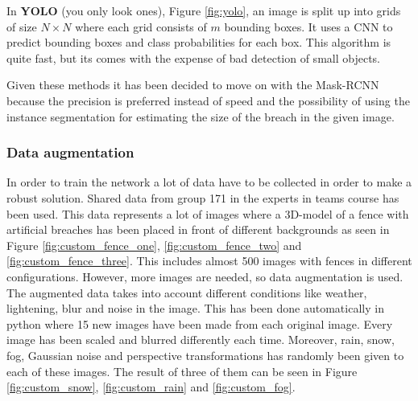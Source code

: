 \documentclass[../Head/Main.tex]{subfiles}
\begin{document}
In \textbf{YOLO} (you only look ones), Figure \ref{fig:yolo}, an image is split up into grids of size $N \times N$ where each grid consists of $m$ bounding boxes. It uses a CNN to predict bounding boxes and class probabilities for each box. This algorithm is quite fast, but its comes with the expense of bad detection of small objects.

Given these methods it has been decided to move on with the Mask-RCNN because the precision is preferred instead of speed and the possibility of using the instance segmentation for estimating the size of the breach in the given image.

\subsubsection*{Data augmentation}
In order to train the network a lot of data have to be collected in order to make a robust solution. Shared data from group 171 in the experts in teams course has been used. This data represents a lot of images where a 3D-model of a fence with artificial breaches has been placed in front of different backgrounds as seen in Figure \ref{fig:custom_fence_one}, \ref{fig:custom_fence_two} and \ref{fig:custom_fence_three}. This includes almost 500 images with fences in different configurations. However, more images are needed, so data augmentation is used. The augmented data takes into account different conditions like weather, lightening, blur and noise in the image. This has been done automatically in python where 15 new images have been made from each original image. Every image has been scaled and blurred differently each time. Moreover, rain, snow, fog, Gaussian noise and perspective transformations has randomly been given to each of these images. The result of three of them can be seen in Figure \ref{fig:custom_snow}, \ref{fig:custom_rain} and \ref{fig:custom_fog}.
\end{document}

